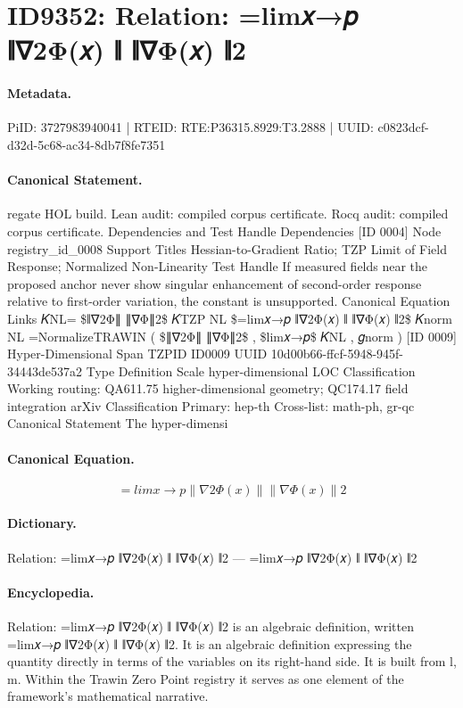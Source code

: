 \section*{ID9352: Relation: =lim𝑥→𝑝 ∥∇2Φ(𝑥) ∥ ∥∇Φ(𝑥) ∥2}
\paragraph{Metadata.}
PiID: 3727983940041 | RTEID: RTE:P36315.8929:T3.2888 | UUID: c0823dcf-d32d-5c68-ac34-8db7f8fe7351

\paragraph{Canonical Statement.}
regate HOL build. Lean audit: compiled corpus certificate. Rocq audit: compiled corpus certificate. Dependencies and Test Handle Dependencies [ID 0004] Node registry\_id\_0008 Support Titles Hessian-to-Gradient Ratio; TZP Limit of Field Response; Normalized Non-Linearity Test Handle If measured fields near the proposed anchor never show singular enhancement of second-order response relative to first-order variation, the constant is unsupported. Canonical Equation Links 𝐾NL= \$∥∇2Φ∥ ∥∇Φ∥2\$ 𝐾TZP NL \$=lim𝑥→𝑝 ∥∇2Φ(𝑥) ∥ ∥∇Φ(𝑥) ∥2\$ 𝐾norm NL =NormalizeTRAWIN ( \$∥∇2Φ∥ ∥∇Φ∥2\$ , \$lim𝑥→𝑝\$ 𝐾NL , 𝑔norm ) [ID 0009] Hyper-Dimensional Span TZPID ID0009 UUID 10d00b66-ffcf-5948-945f-34443de537a2 Type Definition Scale hyper-dimensional LOC Classification Working routing: QA611.75 higher-dimensional geometry; QC174.17 field integration arXiv Classification Primary: hep-th Cross-list: math-ph, gr-qc Canonical Statement The hyper-dimensi

\paragraph{Canonical Equation.}
\[
=lim𝑥→𝑝 ∥∇2Φ(𝑥) ∥ ∥∇Φ(𝑥) ∥2
\]

\paragraph{Dictionary.}
Relation: =lim𝑥→𝑝 ∥∇2Φ(𝑥) ∥ ∥∇Φ(𝑥) ∥2 — =lim𝑥→𝑝 ∥∇2Φ(𝑥) ∥ ∥∇Φ(𝑥) ∥2

\paragraph{Encyclopedia.}
Relation: =lim𝑥→𝑝 ∥∇2Φ(𝑥) ∥ ∥∇Φ(𝑥) ∥2 is an algebraic definition, written =lim𝑥→𝑝 ∥∇2Φ(𝑥) ∥ ∥∇Φ(𝑥) ∥2. It is an algebraic definition expressing the quantity directly in terms of the variables on its right-hand side. It is built from l, m. Within the Trawin Zero Point registry it serves as one element of the framework's mathematical narrative.

